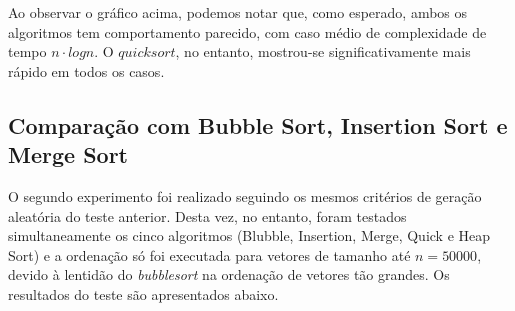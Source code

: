 \documentclass[fontsize=10pt]{article}
\begin{document}
\quad Ao observar o gráfico acima, podemos notar que, como esperado, ambos os algoritmos tem comportamento parecido, com caso médio de complexidade de tempo $n \cdot logn$. O $quicksort$, no entanto, mostrou-se significativamente mais rápido em todos os casos.

\newpage
\subsection{Comparação com Bubble Sort, Insertion Sort e Merge Sort}

\quad O segundo experimento foi realizado seguindo os mesmos critérios de geração aleatória do teste anterior. Desta vez, no entanto, foram testados simultaneamente os cinco algoritmos (Blubble, Insertion, Merge, Quick e Heap Sort) e a ordenação só foi executada para vetores de tamanho até $n = 50000$, devido à lentidão do \textit{bubblesort} na ordenação de vetores tão grandes. Os resultados do teste são apresentados abaixo.
\end{document}
